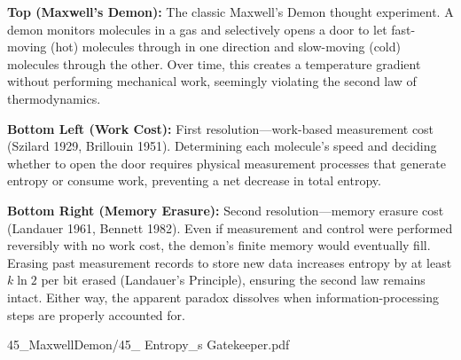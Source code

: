 \begin{SideNotePage}{
  \textbf{Top (Maxwell's Demon):} The classic Maxwell’s Demon thought experiment. A demon monitors molecules in a gas and selectively opens a door to let fast-moving (hot) molecules through in one direction and slow-moving (cold) molecules through the other. Over time, this creates a temperature gradient without performing mechanical work, seemingly violating the second law of thermodynamics. \par
  \textbf{Bottom Left (Work Cost):} First resolution—work-based measurement cost (Szilard 1929, Brillouin 1951). Determining each molecule’s speed and deciding whether to open the door requires physical measurement processes that generate entropy or consume work, preventing a net decrease in total entropy. \par
  \textbf{Bottom Right (Memory Erasure):} Second resolution—memory erasure cost (Landauer 1961, Bennett 1982). Even if measurement and control were performed reversibly with no work cost, the demon’s finite memory would eventually fill. Erasing past measurement records to store new data increases entropy by at least $k \ln 2$ per bit erased (Landauer’s Principle), ensuring the second law remains intact. Either way, the apparent paradox dissolves when information-processing steps are properly accounted for. \par
}{45_MaxwellDemon/45_ Entropy_s Gatekeeper.pdf}
\end{SideNotePage}
